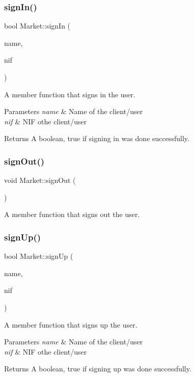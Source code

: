 \subsubsection{\texorpdfstring{sign\+In()}{signIn()}}
{\footnotesize\ttfamily bool Market\+::sign\+In (\begin{DoxyParamCaption}\item[{string}]{name,  }\item[{nif\+\_\+t}]{nif }\end{DoxyParamCaption})}

A member function that signs in the user. 
\begin{DoxyParams}{Parameters}
{\em name} & Name of the client/user \\
\hline
{\em nif} & N\+IF othe client/user \\
\hline
\end{DoxyParams}
\begin{DoxyReturn}{Returns}
A boolean, true if signing in was done successfully. 
\end{DoxyReturn}
\mbox{\label{class_market_acbd4a1e28685f78b6b2c59aa5ca9874f}} 
\subsubsection{\texorpdfstring{sign\+Out()}{signOut()}}
{\footnotesize\ttfamily void Market\+::sign\+Out (\begin{DoxyParamCaption}{ }\end{DoxyParamCaption})}

A member function that signs out the user. \mbox{\label{class_market_afd6b6aae4147a4bd0f00c9d5210730aa}} 
\subsubsection{\texorpdfstring{sign\+Up()}{signUp()}}
{\footnotesize\ttfamily bool Market\+::sign\+Up (\begin{DoxyParamCaption}\item[{string}]{name,  }\item[{nif\+\_\+t}]{nif }\end{DoxyParamCaption})}

A member function that signs up the user. 
\begin{DoxyParams}{Parameters}
{\em name} & Name of the client/user \\
\hline
{\em nif} & N\+IF othe client/user \\
\hline
\end{DoxyParams}
\begin{DoxyReturn}{Returns}
A boolean, true if signing up was done successfully. 
\end{DoxyReturn}


